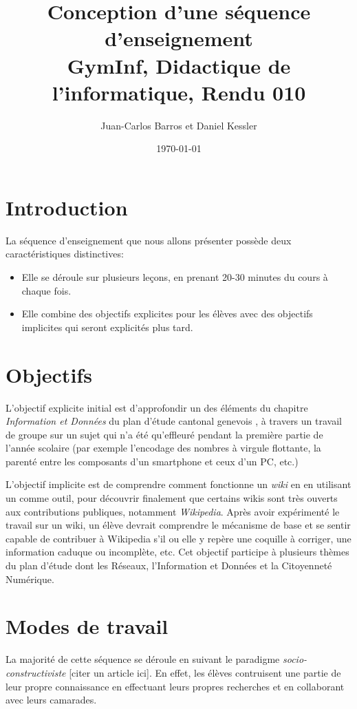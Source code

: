 \documentclass[11pt,bibliography=totoc]{scrartcl}
\author{Juan-Carlos Barros et Daniel Kessler}
\date{\today}
\title{Conception d'une séquence d'enseignement\\\medskip
  \large GymInf, Didactique de l'informatique, Rendu 010}
\begin{document}
\maketitle
\tableofcontents

\pagebreak

\section{Introduction}
La séquence d'enseignement que nous allons présenter possède deux
caractéristiques distinctives:
\begin{itemize}
\item Elle se déroule sur plusieurs leçons, en prenant 20-30 minutes du cours à
  chaque fois.
\item Elle combine des objectifs explicites pour les élèves avec des objectifs
  implicites qui seront explicités plus tard.
\end{itemize}

\section{Objectifs}
L'objectif explicite initial est d'approfondir un des éléments du chapitre
\textit{Information et Données} du plan d'étude cantonal genevois
\cite{pecinfo}, à travers un travail de groupe sur un sujet qui n'a été
qu'effleuré pendant la première partie de l'année scolaire (par exemple
l'encodage des nombres à virgule flottante, la parenté entre les composants d'un
smartphone et ceux d'un PC, etc.)

L'objectif implicite est de comprendre comment fonctionne un \textit{wiki} en en
utilisant un comme outil, pour découvrir finalement que certains wikis sont très
ouverts aux contributions publiques, notamment \textit{Wikipedia}. Après avoir
expérimenté le travail sur un wiki, un élève devrait comprendre le mécanisme de
base et se sentir capable de contribuer à Wikipedia s'il ou elle y repère une
coquille à corriger, une information caduque ou incomplète, etc. Cet objectif
participe à plusieurs thèmes du plan d'étude dont les Réseaux, l'Information et
Données et la Citoyenneté Numérique.

\section{Modes de travail}
La majorité de cette séquence se déroule en suivant le paradigme
\textit{socio-constructiviste} [citer un article ici]. En effet, les élèves
contruisent une partie de leur propre connaissance en effectuant leurs propres
recherches et en collaborant avec leurs camarades.
\end{document}

